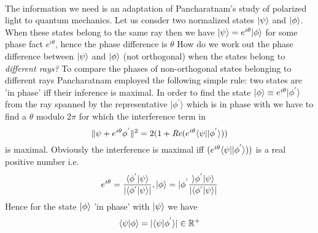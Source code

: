 \paragraph{}
 The information we need is an adaptation of Pancharatnam's study of polarized light to quantum mechanics. 
Let us consder two normalized states $|\psi \rangle$ and $|\phi \rangle$. When these states belong to the same ray then we have
$|\psi \rangle = e^{i\theta}|\phi \rangle$ for some phase fact $e^{i \theta}$, hence the phase difference is $\theta$
How do we work out the phase difference between $|\psi \rangle$ and 
$|\phi \rangle$ (not orthogonal) when the states belong to \textit{different rays?} To compare the phases of non-orthogonal
states belonging to different rays Pancharatnam employed the following simple rule: two states are 'in phase' iff their
inference is maximal. In order to find the state $|\phi \rangle \equiv e^{i\theta}|\phi^{'} \rangle $ from the ray spanned
by the representative $|\phi^{'} \rangle$ which is in phase with \psiket we have to find a $\theta$ modulo $2\pi$
for which the interference term in 
\begin{equation}\label{i}
 \|\psi + e^{i\theta} \phi^{'}\|^{2} = 2 (1 + \mathit{Re}(e^{i\theta}\langle \psi | |\phi^{'} \rangle))
\end{equation}
is maximal. Obviously the interference is maximal iff 
$(e^{i\theta}\langle \psi | |\phi^{'} \rangle))$ is a real positive number i.e. 
\begin{equation}\label{j}
 e^{i \theta} = \dfrac{\langle \phi^{'} |\psi \rangle}{|\langle \phi^{'} |\psi \rangle|}, |\phi \rangle = |\phi^{'} \dfrac{\rangle \phi^{'} | \psi \rangle}
{|\langle \phi^{'}| \psi \rangle |} 
\end{equation}
Hence for the state $|\phi \rangle$ 'in phase' with $|\psi \rangle$ we have 
\begin{equation}\label{k}
 \langle \psi | \phi \rangle = |\langle \psi | \phi^{'} \rangle| \in \mathbb{R}^{+}
\end{equation}
